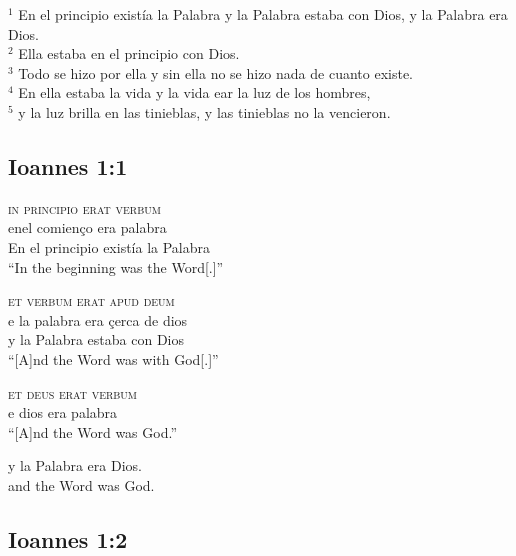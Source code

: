 \documentclass{report}[12pt]
\begin{document}
\begin{tcolorbox}[title=La Biblia de Jerusal\'{e}n]
  $^1$ En el principio exist\'{i}a la Palabra y la Palabra estaba con Dios, y la Palabra era Dios. \\
  $^2$ Ella estaba en el principio con Dios. \\
  $^3$ Todo se hizo por ella y sin ella no se hizo nada de cuanto existe. \\
  $^4$ En ella estaba la vida y la vida ear la luz de los hombres, \\
  $^5$ y la luz brilla en las tinieblas, y las tinieblas no la vencieron. \\
\end{tcolorbox}

\subsection{Ioannes 1:1}

\begin{exe}
  \sn
  \glll 
  \textsc{in} \textsc{principio} \textsc{erat} \textsc{verbum} \\
  enel comien\c{c}o era palabra \\
  {En el} principio exist\'{i}a {la Palabra} \\
  \glt 
  ``In the beginning was the Word[.]''
\end{exe}

\begin{exe}
  \sn
  \glll
  \textsc{et} \textsc{verbum} \textsc{erat} \textsc{apud} \textsc{deum} \\
  e {la palabra} era {\c{c}erca de} dios \\
  y {la Palabra} estaba con Dios \\
  \glt
  ``[A]nd the Word was with God[.]''
\end{exe}

\begin{exe}
  \sn
  \gll
  \textsc{et} \textsc{deus} \textsc{erat} \textsc{verbum}\\
  e dios era palabra \\
  \glt
  ``[A]nd the Word was God.''
\end{exe}

\begin{exe}
  \sn
  \gll
  y la Palabra era Dios. \\
  and the Word was God. \\
\end{exe}

\subsection{Ioannes 1:2}
\end{document}
